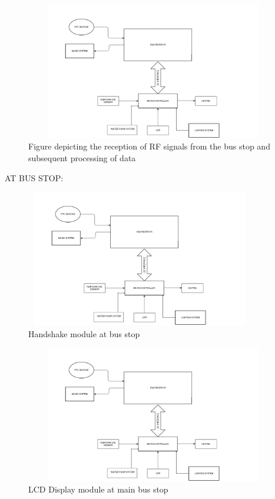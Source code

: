 \documentclass[12pt,a4paper,oneside]{report}
\begin{document}
\begin{onehalfspacing}
\begin{figure}[h]
\includegraphics[width=15cm, height=6cm]{fig1.png}
\centering
\caption{Figure depicting the reception of RF signals from the bus stop and subsequent processing of data}
\label{fig1}
\end{figure}

\newpage
AT BUS STOP:



\begin{figure}[h]
\begin{center}
\leavevmode
\includegraphics[width=10cm, height=6cm]{fig2.png}
\end{center}
\caption{Handshake module at bus stop}
\label{fig2}
\end{figure}

\begin{figure}[h]
\begin{center}
\leavevmode
\includegraphics[width=15cm, height=6cm]{fig3.png}
\end{center}
\caption{LCD Display module at main bus stop}
\label{fig3}
\end{figure}


\end{onehalfspacing}
\end{document}
